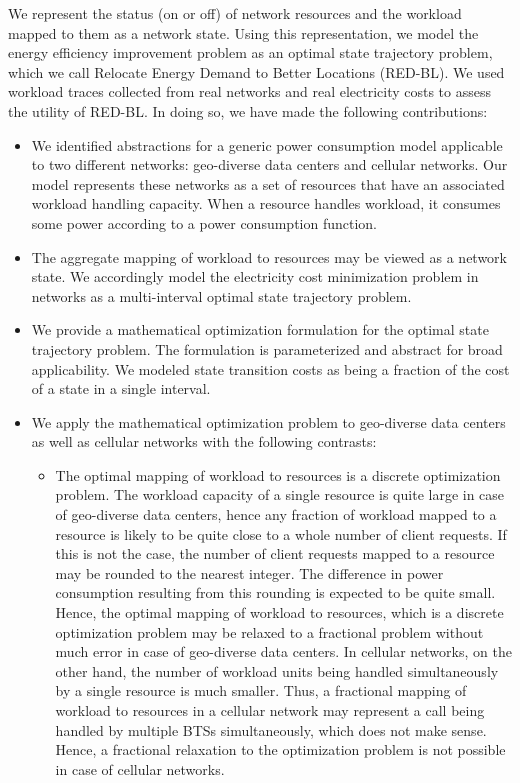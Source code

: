We represent the status (on or off) of network resources and the workload mapped to them as a network state. Using this representation, we model the energy efficiency improvement problem as an optimal state trajectory problem, which we call Relocate Energy Demand to Better Locations (RED-BL). We used workload traces collected from real networks and real electricity costs to assess the utility of RED-BL. In doing so, we have made the following contributions:
\begin{itemize}
\item We identified abstractions for a generic power consumption model applicable to two different networks: geo-diverse data centers and cellular networks. Our model represents these networks as a set of resources that have an associated workload handling capacity. When a resource handles workload, it consumes some power according to a power consumption function. 
\item The aggregate mapping of workload to resources may be viewed as a network state. We accordingly model the electricity cost minimization problem in networks as a multi-interval optimal state trajectory problem.
\item We provide a mathematical optimization formulation for the optimal state trajectory problem. The formulation is parameterized and abstract for broad applicability. We modeled state transition costs as being a fraction of the cost of a state in a single interval.
\item We apply the mathematical optimization problem to geo-diverse data centers as well as cellular networks with the following contrasts:
	\begin{itemize}
	\item The optimal mapping of workload to resources is a discrete optimization problem. The workload capacity of a single resource is quite large in case of geo-diverse data centers, hence any fraction of workload mapped to a resource is likely to be quite close to a whole number of client requests. If this is not the case, the number of client requests mapped to a resource may be rounded to the nearest integer. The difference in power consumption resulting from this rounding is expected to be quite small. Hence, the optimal mapping of workload to resources, which is a discrete optimization problem may be relaxed to a fractional problem without much error in case of geo-diverse data centers. In cellular networks, on the other hand, the number of workload units being handled simultaneously by a single resource is much smaller. Thus, a fractional mapping of workload to resources in a cellular network may represent a call being handled by multiple BTSs simultaneously, which does not make sense. Hence, a fractional relaxation to the optimization problem is not possible in case of cellular networks.

\end{itemize}
\end{itemize}
